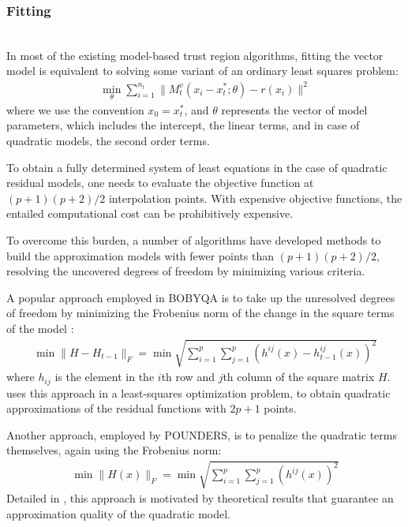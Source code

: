 \subsubsection{Fitting}
\label{subsubsec:fitting}
\hfill\\


\noindent In most of the existing model-based trust region algorithms, fitting the vector model is equivalent to solving some variant of an ordinary least squares problem:
\begin{align}
    \min\limits_{\theta}\sum\limits_{i=1}^{n_t}\lVert M_t^v(x_i-x_t^*;\theta)-r(x_i)\rVert^2
\end{align}
where we use the convention $x_0=x_t^*$, and $\theta$ represents the vector of model parameters, which includes the intercept, the linear terms, and in case of quadratic models, the second order terms.

To obtain a fully determined system of least equations in the case of quadratic residual models, one needs to evaluate the objective function at $(p+1)(p+2)/2$ interpolation points. With expensive objective functions, the entailed computational cost can be prohibitively expensive.

To overcome this burden, a number of algorithms have developed methods to build the approximation models with fewer points than  $(p+1)(p+2)/2$, resolving the uncovered degrees of freedom by minimizing various criteria.

A popular approach employed in BOBYQA is to take up the unresolved degrees of freedom by minimizing the Frobenius norm of the change in the square terms of the model \citet{Powell2003}:
\begin{align}
    \min\lVert H-H_{t-1}\rVert_F = \min\sqrt{\sum\limits_{i=1}^p\sum\limits_{j=1}^{p}(h^{ij}(x)-h^{ij}_{t-1}(x))^2}
    \label{eq:min-frob-diff}
\end{align}
where $h_{ij}$ is the element in the $i$th row and $j$th column of the square matrix $H$. \cite{Zhang2010} uses this approach in a least-squares optimization problem, to obtain quadratic approximations of the residual functions with $2p+1$ points.

Another approach, employed by POUNDERS, is to penalize the quadratic terms themselves, again using the Frobenius norm:
\begin{align}
\min\lVert H(x)\rVert_F =\min\sqrt{\sum\limits_{i=1}^p\sum\limits_{j=1}^{p}(h^{ij}(x))^2}
\label{eq:min-frob}
\end{align}
Detailed in \cite{Wild2008}, this approach is motivated by theoretical results that guarantee an approximation quality of the quadratic model.

